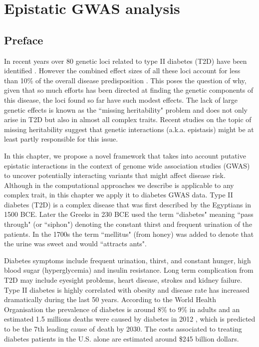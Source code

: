 
\chapter{Epistatic GWAS analysis\label{ch:gwas}}

\section{Preface}

In recent years over 80 genetic loci related to type II diabetes (T2D) have been identified \cite{morris2012large, consortium2014genome}.
However the combined effect sizes of all these loci account for less than 10\% of the overall disease predisposition \cite{manolio2009finding}. 
This poses the question of why, given that so much efforts has been directed at finding the genetic components of this disease, the loci found so far have such modest effects. 
The lack of large genetic effects is known as the ``missing heritability" problem and does not only arise in T2D but also in almost all complex traits. 
Recent studies on the topic of missing heritability \cite{zuk2012mystery, zuk2014searching} suggest that genetic interactions (a.k.a. epistasis) might be at least partly responsible for this issue.

In this chapter, we propose a novel framework that takes into account putative epistatic interactions in the context of genome wide association studies (GWAS) to uncover potentially interacting variants that might affect disease risk. 
Although in the computational approaches we describe is applicable to any complex trait, in this chapter we apply it to diabetes GWAS data.
Type II diabetes (T2D) is a complex disease that was first described by the Egyptians in 1500 BCE. Later the Greeks in 230 BCE used the term ``diabetes" meaning ``pass through" (or ``siphon") denoting the constant thirst and frequent urination of the patients. In the 1700s the term ``mellitus" (from honey) was added to denote that the urine was sweet and would ``attracts ants".

Diabetes symptoms include frequent urination, thirst, and constant hunger, high blood sugar (hyperglycemia) and insulin resistance. 
Long term complication from T2D may include eyesight problems, heart disease, strokes and kidney failure. 
Type II diabetes is highly correlated with obesity and disease rate has increased dramatically during the last 50 years. 
According to the World Health Organisation the prevalence of diabetes is around 8\% to 9\% in adults and an estimated 1.5 millions deaths were caused by diabetes in 2012 \cite{guariguata2014global}, which is predicted to be the 7th leading cause of death by 2030. 
The costs associated to treating diabetes patients in the U.S. alone are estimated around \$245 billion dollars.

